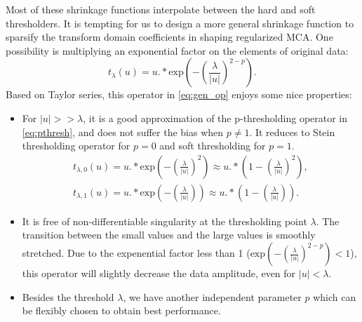 Most of these shrinkage functions interpolate between the hard and soft thresholders. It is tempting for us to design a more general shrinkage function to sparsify the transform domain coefficients in shaping regularized MCA. One possibility is  multiplying an exponential factor on the elements of original data:
\begin{equation}\label{eq:gen_op}
t_{\lambda}(u)=u.*\mathrm{exp}(-(\frac{\lambda}{|u|})^{2-p}).
\end{equation}
Based on Taylor series, this operator in \eqref{eq:gen_op} enjoys some nice properties:
\begin{itemize}
 \item For $|u|>>\lambda$, it is a good approximation of the p-thresholding operator in \eqref{eq:pthresh}, and does not suffer the bias when $p\neq 1$. It reduces to Stein thresholding operator for $p=0$ and soft thresholding for $p=1$. 
  \begin{equation}\label{eq:exp_sergey} 
  \begin{split}   
  t_{\lambda,0}(u)=u.*\mathrm{exp}(-(\frac{\lambda}{|u|})^{2})\approx u.*(1-(\frac{\lambda}{|u|})^{2}),\\
  t_{\lambda,1}(u)=u.*\mathrm{exp}(-(\frac{\lambda}{|u|}))\approx u.*(1-(\frac{\lambda}{|u|})).
  \end{split}
\end{equation}
 \item It is free of non-differentiable singularity at the thresholding point $\lambda$. The transition between the small values and the large values is smoothly stretched. Due to the expenential factor less than 1 ($\mathrm{exp}(-(\frac{\lambda}{|u|})^{2-p})<1$), this operator will slightly decrease the data amplitude, even for $|u|<\lambda$.
 \item Besides the threshold $\lambda$, we have another independent parameter $p$ which can be flexibly chosen to obtain best performance.
\end{itemize}

